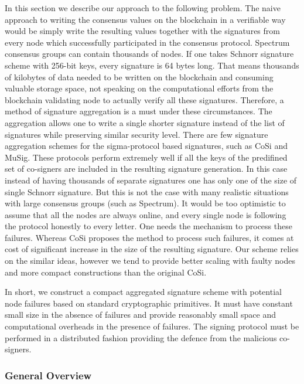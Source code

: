 In this section we describe our approach to the following problem. The naive approach to writing the consensus values on
the blockchain in a verifiable way would be simply write the resulting values together with the signatures from every
node which successfully participated in the consensus protocol. Spectrum consensus groups can contain thousands of
nodes. If one takes Schnorr signature scheme with 256-bit keys, every signature is 64 bytes long. That means thousands
of kilobytes of data needed to be written on the blockchain and consuming valuable storage space, not speaking on the
computational efforts from the blockchain validating node to actually verify all these signatures. Therefore, a method
of signature aggregation is a must under these circumstances. The aggregation allows one to write a single shorter
signature instead of the list of signatures while preserving similar security level. There are few signature aggregation
schemes for the sigma-protocol based signatures, such as CoSi and MuSig. These protocols perform extremely well if all
the keys of the predifined set of co-signers are included in the resulting signature generation. In this case instead of
having thousands of separate signatures one has only one of the size of single Schnorr signature. But this is not the
case with many realistic situations with large consensus groups (such as Spectrum). It would be too optimistic to
assume that all the nodes are always online, and every single node is following the protocol honestly to every letter.
One needs the mechanism to process these failures. Whereas CoSi proposes the method to process such failures, it comes
at cost of significant increase in the size of the resulting signature. Our scheme relies on the similar ideas, however
we tend to provide better scaling with faulty nodes and more compact constructions than the original CoSi.

In short, we construct a compact aggregated signature scheme with potential node failures based on standard cryptographic
primitives. It must have constant small size in the absence of failures and provide reasonably small space and
computational overheads in the presence of failures. The signing protocol must be performed in a distributed fashion
providing the defence from the malicious co-signers.

\subsubsection{General Overview}

